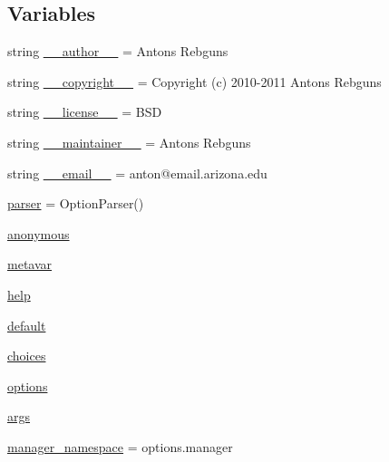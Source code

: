 \subsection*{Variables}
\begin{DoxyCompactItemize}
\item 
string \hyperlink{namespacecontroller__spawner_a0ca61a916cc57e9aa5ac65a716ca545d}{\+\_\+\+\_\+author\+\_\+\+\_\+} = \textquotesingle{}Antons Rebguns\textquotesingle{}
\item 
string \hyperlink{namespacecontroller__spawner_a4267e6b265bd36751c11cc50aba279aa}{\+\_\+\+\_\+copyright\+\_\+\+\_\+} = \textquotesingle{}Copyright (c) 2010-\/2011 Antons Rebguns\textquotesingle{}
\item 
string \hyperlink{namespacecontroller__spawner_aaacb4309b873d8d17698f1362a7f8938}{\+\_\+\+\_\+license\+\_\+\+\_\+} = \textquotesingle{}B\+SD\textquotesingle{}
\item 
string \hyperlink{namespacecontroller__spawner_aeda41fc81ad9b01d3d095cd3527f9e11}{\+\_\+\+\_\+maintainer\+\_\+\+\_\+} = \textquotesingle{}Antons Rebguns\textquotesingle{}
\item 
string \hyperlink{namespacecontroller__spawner_a16a4b4af08e18b36425aaa20ea006e37}{\+\_\+\+\_\+email\+\_\+\+\_\+} = \textquotesingle{}anton@email.\+arizona.\+edu\textquotesingle{}
\item 
\hyperlink{namespacecontroller__spawner_af87596ad12e5f930a35ae92988be1851}{parser} = Option\+Parser()
\item 
\hyperlink{namespacecontroller__spawner_ab77eae868296d4afe882b65bd4d25407}{anonymous}
\item 
\hyperlink{namespacecontroller__spawner_a9a98b03f916859ebbaae75aec66a1d0c}{metavar}
\item 
\hyperlink{namespacecontroller__spawner_a6fd1b66d8e083807ae119d55764a2dff}{help}
\item 
\hyperlink{namespacecontroller__spawner_aa2c3433695a7cdd47d625f0c5399f43b}{default}
\item 
\hyperlink{namespacecontroller__spawner_a54df248a9ffe51f30b040bc8fce59607}{choices}
\item 
\hyperlink{namespacecontroller__spawner_a64f43de22d31acba295567da8fe3fb3d}{options}
\item 
\hyperlink{namespacecontroller__spawner_aa4c2175a779b73777468233b45686392}{args}
\item 
\hyperlink{namespacecontroller__spawner_aee6b2ce8cdb4e7ffd894cbe211b09a0c}{manager\+\_\+namespace} = options.\+manager
\item 

\end{DoxyCompactItemize}
